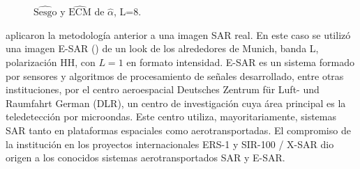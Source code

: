 \begin{figure}[htb]
	\centering
	\caption{\small $\widehat{\text{Sesgo}}$ y $\widehat{\text{ECM}}$ de $\widehat{\alpha}$, L=$8$.}
\end{figure}

\citet{APSAR2013ParameterEstimationStochasticDistances} aplicaron la metodología anterior a una imagen SAR real. En este caso se utilizó una imagen E-SAR (\citet{Horn1996}) de un look de los alrededores de Munich, banda L, polarización HH, con $L=1$ en formato intensidad.
E-SAR es un sistema formado por sensores y algoritmos de procesamiento de señales desarrollado, entre otras instituciones, por el centro aeroespacial Deutsches Zentrum für Luft- und Raumfahrt German (DLR), un centro de investigación cuya área principal es la teledetección por microondas.  Este centro utiliza, mayoritariamente, sistemas SAR tanto en plataformas espaciales como aerotransportadas. El compromiso de la institución en los proyectos internacionales ERS-1 y SIR-100 / X-SAR dio origen a los conocidos sistemas aerotransportados SAR y E-SAR. 

